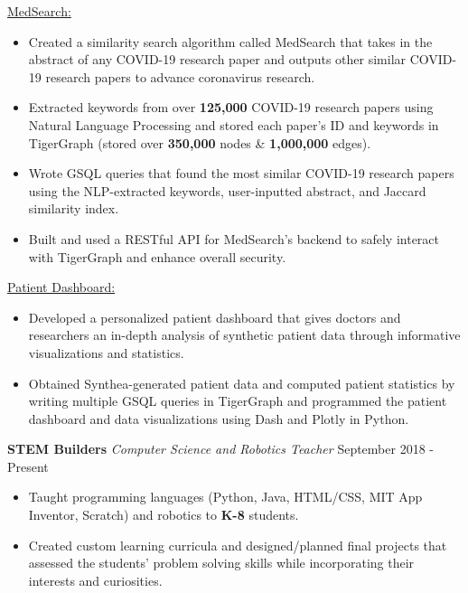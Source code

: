 \documentclass[11pt]{res}
\begin{document}
\begin{footnotesize}
\begin{resume}
\setlength{\parindent}{4ex}\underline{MedSearch:}
\vspace{-4.75mm}
\begin{itemize} \itemsep -2pt 
\item Created a similarity search algorithm called MedSearch that takes in the abstract of any COVID-19 research paper and outputs other similar COVID-19 research papers to advance coronavirus research.
\vspace{1mm}
\item Extracted keywords from over \textbf{125,000} COVID-19 research papers using Natural Language Processing and stored each paper's ID and keywords in TigerGraph (stored over \textbf{350,000} nodes \& \textbf{1,000,000} edges).
\vspace{1mm}
\item Wrote GSQL queries that found the most similar COVID-19 research papers using the NLP-extracted keywords, user-inputted abstract, and Jaccard similarity index.
\vspace{1mm}
\item Built and used a RESTful API for MedSearch's backend to safely interact with TigerGraph and enhance overall security.
\end{itemize}
\vspace{-4.5mm}

\setlength{\parindent}{4ex}\underline{Patient Dashboard:}
\vspace{-4.75mm}
\begin{itemize} \itemsep -2pt 
\item Developed a personalized patient dashboard that gives doctors and researchers an in-depth analysis of synthetic patient data through informative visualizations and statistics. 
\vspace{1mm}
\item Obtained Synthea-generated patient data and computed patient statistics by writing multiple GSQL queries in TigerGraph and programmed the patient dashboard and data visualizations using Dash and Plotly in Python.
\end{itemize}
\vspace{-2.5mm}
\textbf{STEM Builders} {\sl Computer Science and Robotics Teacher} \hfill September 2018 - Present\vspace{-4.75mm}
\begin{itemize} \itemsep -2pt 
\item Taught programming languages (Python, Java, HTML/CSS, MIT App Inventor, Scratch) and robotics to \textbf{K-8} students. 
\vspace{1mm}
\item Created custom learning curricula and designed/planned final projects that assessed the students' problem solving skills while incorporating their interests and curiosities. 
\end{itemize}
\begin{small}

\end{small}
\end{resume}
\end{footnotesize}
\end{document}
